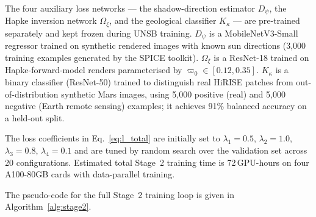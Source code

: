 \documentclass[10pt,journal]{IEEEtran}
\begin{document}
The four auxiliary loss networks --- the shadow-direction estimator $D_\psi$,
the Hapke inversion network $\Omega_\xi$, and the geological classifier
$K_\kappa$ --- are pre-trained separately and kept frozen during UNSB
training. $D_\psi$ is a MobileNetV3-Small regressor trained on synthetic
rendered images with known sun directions (3{,}000 training examples generated
by the SPICE toolkit). $\Omega_\xi$ is a ResNet-18 trained on
Hapke-forward-model renders parameterised by $\varpi_0 \in [0.12, 0.35]$.
$K_\kappa$ is a binary classifier (ResNet-50) trained to distinguish real
HiRISE patches from out-of-distribution synthetic Mars images, using 5{,}000
positive (real) and 5{,}000 negative (Earth remote sensing) examples; it
achieves 91\% balanced accuracy on a held-out split.

The loss coefficients in Eq.~\ref{eq:l_total} are initially set to
$\lambda_1 = 0.5$, $\lambda_2 = 1.0$, $\lambda_3 = 0.8$, $\lambda_4 = 0.1$
and are tuned by random search over the validation set across 20 configurations.
Estimated total Stage~2 training time is 72\,GPU-hours on four A100-80GB
cards with data-parallel training.

The pseudo-code for the full Stage~2 training loop is given in
Algorithm~\ref{alg:stage2}.
\end{document}
